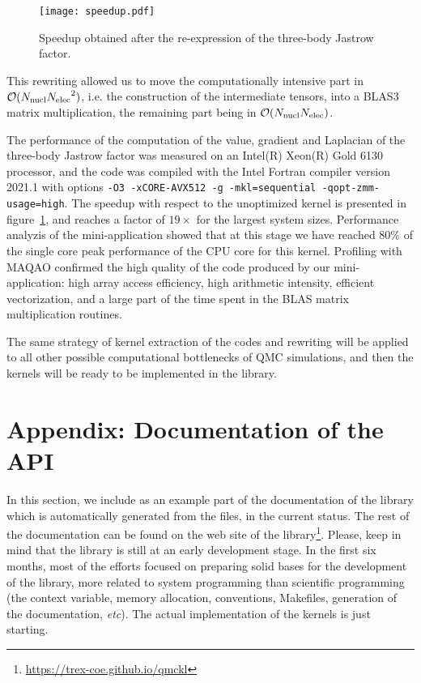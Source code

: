 \begin{figure}[t]
  \begin{center}
  \texttt{[image: speedup.pdf]}
  \end{center}
  \caption{\label{fig:speedup}Speedup obtained after the re-expression of the three-body
    Jastrow factor.}
\end{figure}

This rewriting allowed us to move the computationally intensive part in
$\mathcal{O}(N_{\text{nucl}}{N_{\text{elec}}}^2)$, i.e. the construction of the intermediate
tensors, into a BLAS3 matrix multiplication, the remaining part being
in $\mathcal{O}(N_{\text{nucl}} N_{\text{elec}})$.

The performance of the computation of the value, gradient and Laplacian of
the three-body Jastrow factor was measured on an Intel(R) Xeon(R) Gold
6130 processor, and the code was compiled with the Intel Fortran
compiler version 2021.1 with options
\texttt{-O3 -xCORE-AVX512 -g -mkl=sequential -qopt-zmm-usage=high}.
The speedup with respect to the unoptimized kernel is presented in
figure~\ref{fig:speedup}, and reaches a factor of $19\times$ for the
largest system sizes. Performance analyzis of the mini-application
showed that at this stage we have reached 80\% of the single core peak
performance of the CPU core for this kernel. Profiling with MAQAO
confirmed the high quality of the code produced by our mini-application:
high array access efficiency, high arithmetic intensity, efficient
vectorization, and a large part of the time spent in the BLAS matrix
multiplication routines.

The same strategy of kernel extraction of the codes and rewriting
will be applied to all other possible computational bottlenecks of QMC
simulations, and then the kernels will be ready to be implemented in
the library.




\appendix
\section{Appendix: Documentation of the API}

In this section, we include as an example part of the documentation of
the library which is automatically generated from the {\orgmode}
files, in the current status. The rest of the documentation can be
found on the web site of the library\footnote{\url{https://trex-coe.github.io/qmckl}}.
Please, keep in mind that the library is still at an early development
stage. In the first six months, most of the efforts focused on
preparing solid bases for the development of
the library, more related to system programming than scientific
programming (the context variable, memory allocation, conventions,
Makefiles, generation of the documentation, \textit{etc}). The actual
implementation of the kernels is just starting.


\clearpage


